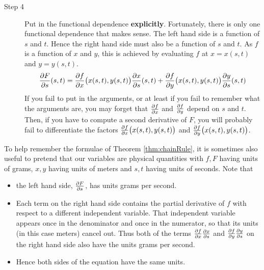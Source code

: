 \begin{description}
\item[Step 4] 
Put in the functional dependence \textbf{explicitly}. Fortunately,
there is only one functional dependence that makes sense. 
The left hand side is a function of $s$ and $t$. Hence the
 right hand side must also be a function of $s$ and $t$. As $f$ is a
 function of $x$ and $y$, this is achieved by evaluating $f$ at $x=x(s,t)$
 and $y=y(s,t)$.
$$
\pdiff{F}{s}(s,t)=
  \pdiff{f}{x}\big(x(s,t),y(s,t)\big)
  \pdiff{x}{s}(s,t)
  +\pdiff{f}{y}\big(x(s,t),y(s,t)\big)
  \pdiff{y}{s}(s,t)
$$
If you fail to put in the arguments, or at least if you fail to remember
what the arguments are, you may forget that $\pdiff{f}{x}$ and $\pdiff{f}{y}$
depend on $s$ and $t$. Then, if you have to compute a second derivative of $F$,
you will probably fail to differentiate the factors  $\pdiff{f}{x}\big(x(s,t),y(s,t)\big)$ and
$\pdiff{f}{y}\big(x(s,t),y(s,t)\big)$.

\end{description}



To help remember the formulae of Theorem \ref{thm:chainRule}, it is sometimes 
also useful to pretend that our variables are physical quantities with 
$f,F$ having units of grams, $x,y$ having units of meters and $s,t$ having units of seconds. Note that
\begin{itemize}
\item 
the left hand side, $\pdiff{F}{s}$, has units grams per second.
\item
Each term on the right hand side
contains the partial derivative of $f$ with respect to a different
 independent variable. That independent variable appears once in the
 denominator and once in the numerator, so that its units (in this case meters)
cancel out. Thus both of the terms $\pdiff{f}{x }\pdiff{x }{s}$
and $\pdiff{f}{y }\pdiff{y }{s}$ on the right hand side also have 
the units grams per second.

\item
Hence both sides of the equation have the same units.

\end{itemize}




